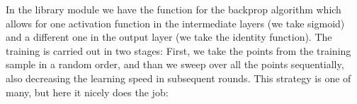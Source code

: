 \documentclass[a4paper,12pt,polish]{jupyterBook}
\begin{document}
\sphinxAtStartPar
In the library module  we have the function for the backprop algorithm which allows for one activation function in the intermediate layers (we take sigmoid) and a different one in the output layer (we take the identity function). The training is carried out in two stages: First, we take the points from the training sample in a random order, and than we sweep over all the points sequentially, also decreasing the learning speed in subsequent rounds. This strategy is one of many, but here it nicely does the job:
\begin{sphinxVerbatimInput}

\begin{sphinxVerbatim}[commandchars=\\\{\}]
                           
                   
        
         
\end{sphinxVerbatim}
\end{sphinxVerbatimInput}
\end{document}
